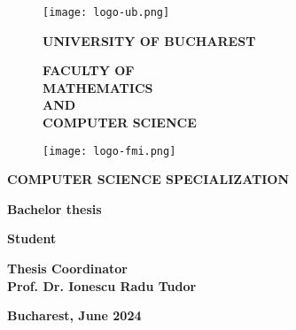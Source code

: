 \begin{titlepage}


\begin{figure}[!htb]
    \centering
    \begin{minipage}{0.2\textwidth}
        \texttt{[image: logo-ub.png]}
    \end{minipage}
    \begin{minipage}{0.5\textwidth}
        \large
        \vspace{0.2cm}
        \begin{center}
            \textbf{UNIVERSITY OF BUCHAREST}
        \end{center}
        \vspace{0.3cm}
        \begin{center}
            \textbf{
                FACULTY OF \\
                MATHEMATICS \\
                AND \\
                COMPUTER SCIENCE
            }
        \end{center}
    \end{minipage}
    \begin{minipage}{0.2\textwidth}
        \texttt{[image: logo-fmi.png]}
    \end{minipage}
\end{figure}

\begin{center}
\textbf{COMPUTER SCIENCE SPECIALIZATION}
\end{center}

\vspace{1cm}

\begin{center}
\Large \textbf{Bachelor thesis}
\end{center}

\begin{center}
\huge \textbf{\MakeUppercase{\@title}}
\end{center}

\vspace{3cm}

\begin{center}
\large \textbf{Student \\ \@author}
\end{center}

\vspace{0.25cm}

\begin{center}
\large \textbf{Thesis Coordinator \\ Prof. Dr. Ionescu Radu Tudor}
\end{center}

\vspace{2cm}

\begin{center}
\Large \textbf{Bucharest, June 2024}
\end{center}
\end{titlepage}